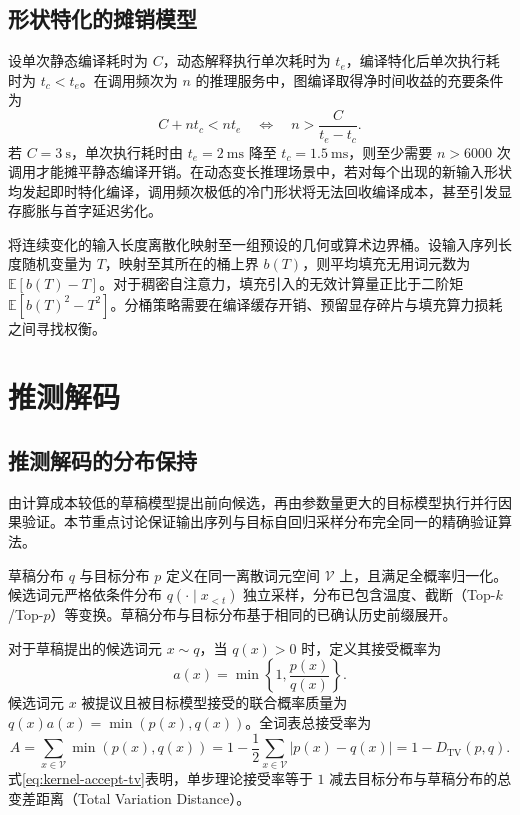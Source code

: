 \documentclass[../textbook.tex]{subfiles}
\begin{document}
\subsection{形状特化的摊销模型}
设单次静态编译耗时为 $C$，动态解释执行单次耗时为 $t_e$，编译特化后单次执行耗时为 $t_c<t_e$。在调用频次为 $n$ 的推理服务中，图编译取得净时间收益的充要条件为
\begin{equation}
 C+nt_c<nt_e\quad\Longleftrightarrow\quad n>\frac{C}{t_e-t_c}.
 \label{eq:kernel-amortize}
\end{equation}
若 $C=\qty{3}{\second}$，单次执行耗时由 $t_e=\qty{2}{\milli\second}$ 降至 $t_c=\qty{1.5}{\milli\second}$，则至少需要 $n>\num{6000}$ 次调用才能摊平静态编译开销。在动态变长推理场景中，若对每个出现的新输入形状均发起即时特化编译，调用频次极低的冷门形状将无法回收编译成本，甚至引发显存膨胀与首字延迟劣化。

将连续变化的输入长度离散化映射至一组预设的几何或算术边界桶。设输入序列长度随机变量为 $T$，映射至其所在的桶上界 $b(T)$，则平均填充无用词元数为 $\mathbb{E}[b(T)-T]$。对于稠密自注意力，填充引入的无效计算量正比于二阶矩 $\mathbb{E}[b(T)^2-T^2]$。分桶策略需要在编译缓存开销、预留显存碎片与填充算力损耗之间寻找权衡。

\section{推测解码}

\subsection{推测解码的分布保持}
由计算成本较低的草稿模型提出前向候选，再由参数量更大的目标模型执行并行因果验证\autocite{leviathan2023speculative}。本节重点讨论保证输出序列与目标自回归采样分布完全同一的精确验证算法。

\begin{assumption}[采样分布条件]
草稿分布 $q$ 与目标分布 $p$ 定义在同一离散词元空间 $\mathcal{V}$ 上，且满足全概率归一化。候选词元严格依条件分布 $q(\cdot\mid x_{<t})$ 独立采样，分布已包含温度、截断（Top-$k$/Top-$p$）等变换。草稿分布与目标分布基于相同的已确认历史前缀展开。
\end{assumption}

对于草稿提出的候选词元 $x\sim q$，当 $q(x)>0$ 时，定义其接受概率为
\begin{equation}
 a(x)=\min\left\{1,\frac{p(x)}{q(x)}\right\}.
\end{equation}
候选词元 $x$ 被提议且被目标模型接受的联合概率质量为 $q(x)a(x)=\min(p(x),q(x))$。全词表总接受率为
\begin{equation}
 A=\sum_{x\in\mathcal{V}}\min(p(x),q(x))
 =1-\frac{1}{2}\sum_{x\in\mathcal{V}}|p(x)-q(x)|=1-D_{\mathrm{TV}}(p,q).
 \label{eq:kernel-accept-tv}
\end{equation}
式\eqref{eq:kernel-accept-tv}表明，单步理论接受率等于 $1$ 减去目标分布与草稿分布的总变差距离（Total Variation Distance）。
\end{document}
